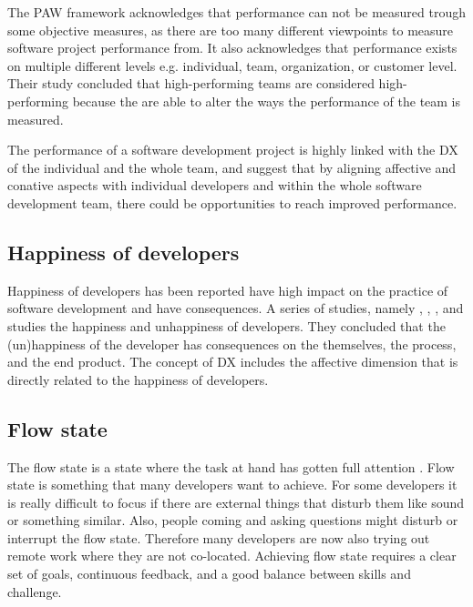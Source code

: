 \documentclass[english, 12pt, a4paper, sci, utf8, a-1b, online]{aaltothesis}
\begin{document}
The PAW framework acknowledges that performance can not be measured trough some objective measures, as there are too many different viewpoints to measure software project performance from. It also acknowledges that performance exists on multiple different levels e.g. individual, team, organization, or customer level. Their study concluded that high-performing teams are considered high-performing because the are able to alter the ways the performance of the team is measured.

The performance of a software development project is highly linked with the DX of the individual and the whole team, and \textcite{how-developers-experience-team-performance} suggest that by aligning affective and conative aspects with individual developers and within the whole software development team, there could be opportunities to reach improved performance.

\subsection{Happiness of developers}

Happiness of developers has been reported have high impact on the practice of software development and have consequences. A series of studies, namely \textcite{unhappy-developers}, \textcite{on-the-unhappiness}, \textcite{consequences-of-unhappiness}, and \textcite{what-happens-when-unhappy} studies the happiness and unhappiness of developers. They concluded that the (un)happiness of the developer has consequences on the themselves, the process, and the end product. The concept of DX \parencite{fagerholm-dx-concept-and-definition} includes the affective dimension that is directly related to the happiness of developers.

\subsection{Flow state}

The flow state is a state where the task at hand has gotten full attention \parencite{flow-intrinsic-dx}. Flow state is something that many developers want to achieve. For some developers it is really difficult to focus if there are external things that disturb them like sound or something similar. Also, people coming and asking questions might disturb or interrupt the flow state. Therefore many developers are now also trying out remote work where they are not co-located. Achieving flow state requires a clear set of goals, continuous feedback, and a good balance between skills and challenge.
\end{document}
